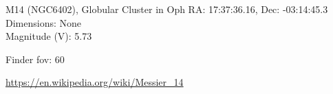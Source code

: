 \begin{block}{M14 (NGC6402), Globular Cluster in Oph}
    RA: 17:37:36.16, Dec: -03:14:45.3 \\ 
    Dimensions: None \\ 
    Magnitude (V): 5.73



    Finder fov: 60 

    \url{https://en.wikipedia.org/wiki/Messier_14} 
\end{block}